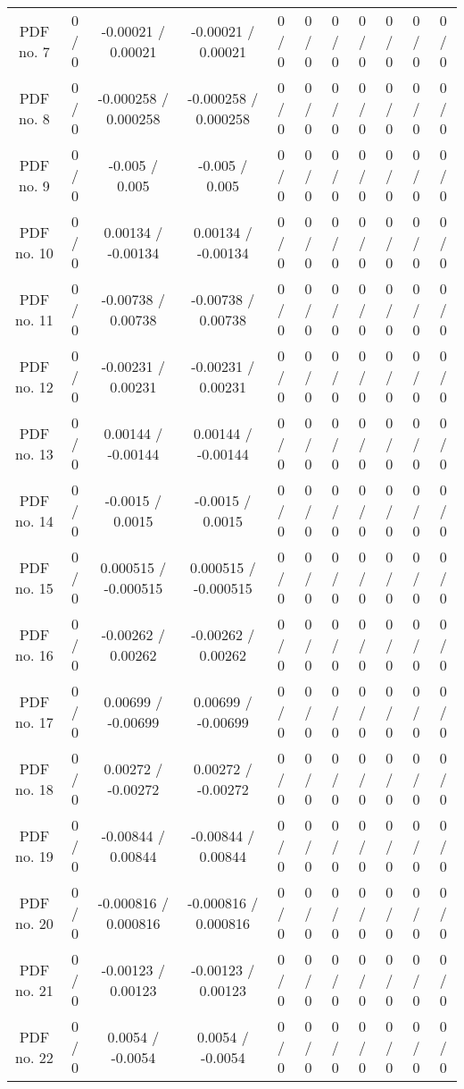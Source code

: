 \begin{table}[htbp]
\begin{center}
\begin{tabular}{|c|c|c|c|c|c|c|c|c|c|c|}
  PDF no. 7 & 0 / 0 & -0.00021 / 0.00021 & -0.00021 / 0.00021 & 0 / 0 & 0 / 0 & 0 / 0 & 0 / 0 & 0 / 0 & 0 / 0 & 0 / 0 \\ 
  PDF no. 8 & 0 / 0 & -0.000258 / 0.000258 & -0.000258 / 0.000258 & 0 / 0 & 0 / 0 & 0 / 0 & 0 / 0 & 0 / 0 & 0 / 0 & 0 / 0 \\ 
  PDF no. 9 & 0 / 0 & -0.005 / 0.005 & -0.005 / 0.005 & 0 / 0 & 0 / 0 & 0 / 0 & 0 / 0 & 0 / 0 & 0 / 0 & 0 / 0 \\ 
  PDF no. 10 & 0 / 0 & 0.00134 / -0.00134 & 0.00134 / -0.00134 & 0 / 0 & 0 / 0 & 0 / 0 & 0 / 0 & 0 / 0 & 0 / 0 & 0 / 0 \\ 
  PDF no. 11 & 0 / 0 & -0.00738 / 0.00738 & -0.00738 / 0.00738 & 0 / 0 & 0 / 0 & 0 / 0 & 0 / 0 & 0 / 0 & 0 / 0 & 0 / 0 \\ 
  PDF no. 12 & 0 / 0 & -0.00231 / 0.00231 & -0.00231 / 0.00231 & 0 / 0 & 0 / 0 & 0 / 0 & 0 / 0 & 0 / 0 & 0 / 0 & 0 / 0 \\ 
  PDF no. 13 & 0 / 0 & 0.00144 / -0.00144 & 0.00144 / -0.00144 & 0 / 0 & 0 / 0 & 0 / 0 & 0 / 0 & 0 / 0 & 0 / 0 & 0 / 0 \\ 
  PDF no. 14 & 0 / 0 & -0.0015 / 0.0015 & -0.0015 / 0.0015 & 0 / 0 & 0 / 0 & 0 / 0 & 0 / 0 & 0 / 0 & 0 / 0 & 0 / 0 \\ 
  PDF no. 15 & 0 / 0 & 0.000515 / -0.000515 & 0.000515 / -0.000515 & 0 / 0 & 0 / 0 & 0 / 0 & 0 / 0 & 0 / 0 & 0 / 0 & 0 / 0 \\ 
  PDF no. 16 & 0 / 0 & -0.00262 / 0.00262 & -0.00262 / 0.00262 & 0 / 0 & 0 / 0 & 0 / 0 & 0 / 0 & 0 / 0 & 0 / 0 & 0 / 0 \\ 
  PDF no. 17 & 0 / 0 & 0.00699 / -0.00699 & 0.00699 / -0.00699 & 0 / 0 & 0 / 0 & 0 / 0 & 0 / 0 & 0 / 0 & 0 / 0 & 0 / 0 \\ 
  PDF no. 18 & 0 / 0 & 0.00272 / -0.00272 & 0.00272 / -0.00272 & 0 / 0 & 0 / 0 & 0 / 0 & 0 / 0 & 0 / 0 & 0 / 0 & 0 / 0 \\ 
  PDF no. 19 & 0 / 0 & -0.00844 / 0.00844 & -0.00844 / 0.00844 & 0 / 0 & 0 / 0 & 0 / 0 & 0 / 0 & 0 / 0 & 0 / 0 & 0 / 0 \\ 
  PDF no. 20 & 0 / 0 & -0.000816 / 0.000816 & -0.000816 / 0.000816 & 0 / 0 & 0 / 0 & 0 / 0 & 0 / 0 & 0 / 0 & 0 / 0 & 0 / 0 \\ 
  PDF no. 21 & 0 / 0 & -0.00123 / 0.00123 & -0.00123 / 0.00123 & 0 / 0 & 0 / 0 & 0 / 0 & 0 / 0 & 0 / 0 & 0 / 0 & 0 / 0 \\ 
  PDF no. 22 & 0 / 0 & 0.0054 / -0.0054 & 0.0054 / -0.0054 & 0 / 0 & 0 / 0 & 0 / 0 & 0 / 0 & 0 / 0 & 0 / 0 & 0 / 0 \\ 

\end{tabular}
\end{center}
\end{table}
